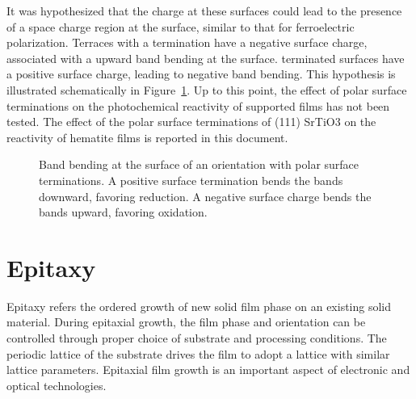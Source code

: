 \documentclass[12pt,%
              twoside,
               letterpaper]{uiothesis}
\begin{document}
It was hypothesized that the charge at these surfaces could lead to the presence of a
space charge region at the surface, similar to that for ferroelectric polarization.
Terraces with a  termination have a negative surface charge, associated with
a upward band bending at the surface.  terminated surfaces have a positive
surface charge, leading to negative band bending. This hypothesis is illustrated
schematically in Figure~\ref{fig:polarterminations}. Up to this point, the effect of polar
surface terminations on the photochemical reactivity of supported films has not been
tested. The effect of the polar surface terminations of (111) SrTiO3 on the
reactivity of hematite films is reported in this document.
\begin{figure}
	\caption[Band bending arising from polar surface terminations]{%
		Band bending at the surface of an orientation with polar surface 
		terminations. A positive surface termination bends the bands 
		downward, favoring reduction. A negative surface charge bends the 
		bands upward, favoring oxidation.}
	\label{fig:polarterminations}
\end{figure}


\section{Epitaxy}
\label{sec:background.epitaxy}


Epitaxy refers the ordered growth of new solid film phase on an existing solid
material.\cite{Opel:2012ge,Herman:2004to,Hooks:2001vy} During epitaxial growth, the  film
phase and orientation can be controlled through proper choice of substrate and processing
conditions. The periodic lattice of the substrate drives the film to adopt a lattice with
similar lattice parameters. Epitaxial film growth is an important aspect of electronic and
optical technologies.
\end{document}
